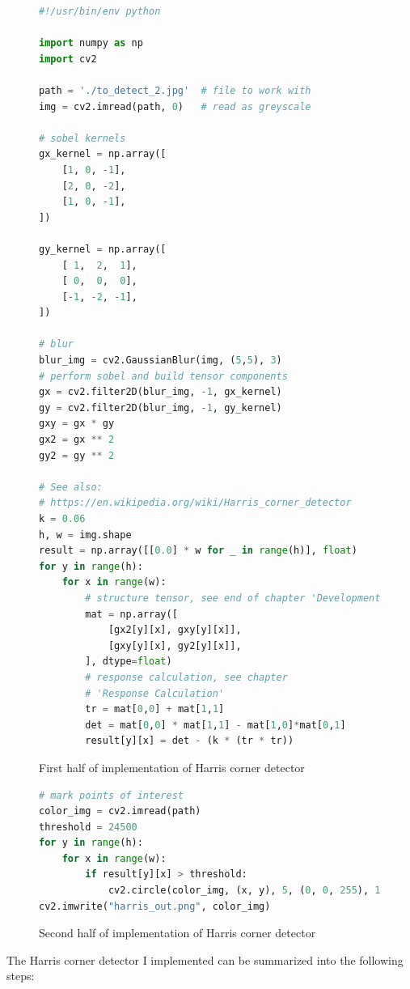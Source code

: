 \documentclass[a4paper, titlepage,12pt]{article}
\begin{document}
	\begin{figure}[H]
		\begin{center}
	\begin{lstlisting}[language=Python]
#!/usr/bin/env python

import numpy as np
import cv2

path = './to_detect_2.jpg'	# file to work with
img = cv2.imread(path, 0)	# read as greyscale

# sobel kernels
gx_kernel = np.array([
    [1, 0, -1],
    [2, 0, -2],
    [1, 0, -1],
])

gy_kernel = np.array([
    [ 1,  2,  1],
    [ 0,  0,  0],
    [-1, -2, -1],
])

# blur
blur_img = cv2.GaussianBlur(img, (5,5), 3)
# perform sobel and build tensor components
gx = cv2.filter2D(blur_img, -1, gx_kernel)
gy = cv2.filter2D(blur_img, -1, gy_kernel)
gxy = gx * gy
gx2 = gx ** 2
gy2 = gy ** 2

# See also:
# https://en.wikipedia.org/wiki/Harris_corner_detector
k = 0.06
h, w = img.shape
result = np.array([[0.0] * w for _ in range(h)], float)
for y in range(h):
    for x in range(w):
		# structure tensor, see end of chapter 'Development'
        mat = np.array([
            [gx2[y][x], gxy[y][x]],
            [gxy[y][x], gy2[y][x]],
        ], dtype=float)
		# response calculation, see chapter 
		# 'Response Calculation'
        tr = mat[0,0] + mat[1,1]
        det = mat[0,0] * mat[1,1] - mat[1,0]*mat[0,1]
        result[y][x] = det - (k * (tr * tr))

	\end{lstlisting}
	\caption{First half of implementation of Harris corner detector}
	\end{center}
	\end{figure}

	\begin{figure}[H]
		\begin{center}
	\begin{lstlisting}[language=Python]
# mark points of interest
color_img = cv2.imread(path)
threshold = 24500
for y in range(h):
    for x in range(w):
        if result[y][x] > threshold:
            cv2.circle(color_img, (x, y), 5, (0, 0, 255), 1)
cv2.imwrite("harris_out.png", color_img)
	\end{lstlisting}
			\caption{Second half of implementation of Harris corner detector}
	\end{center}
	\end{figure}

	The Harris corner detector I implemented can be summarized into the following steps:
\end{document}
